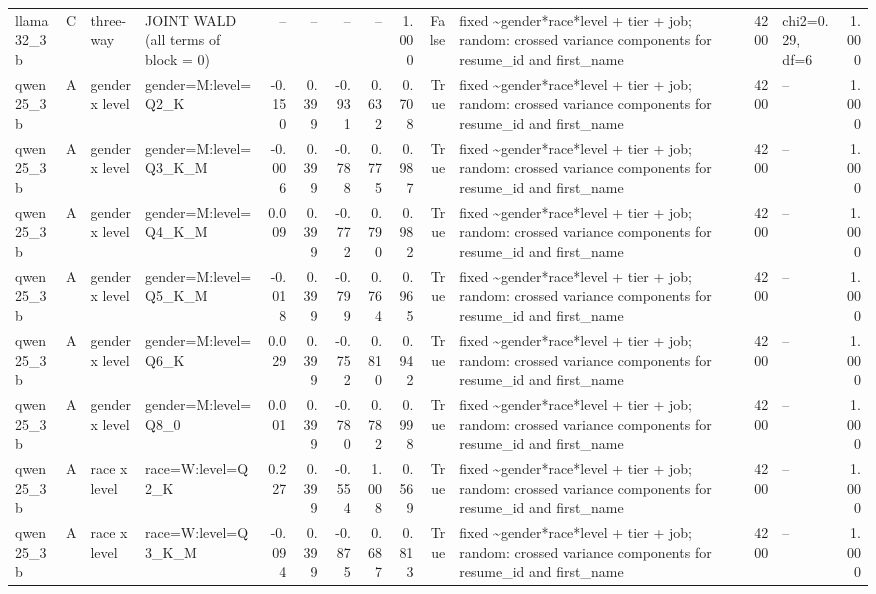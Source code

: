 \begin{tabular}{llllrrrrrrlrlr}
llama32\_3b & C & three-way & JOINT WALD (all terms of block = 0) & -- & -- & -- & -- & 1.000 & False & fixed \textasciitilde \space gender*race*level + tier + job; random: crossed variance components for resume\_id and first\_name & 4200 & chi2=0.29, df=6 & 1.000 \\
qwen25\_3b & A & gender x level & gender=M:level=Q2\_K & -0.150 & 0.399 & -0.931 & 0.632 & 0.708 & True & fixed \textasciitilde \space gender*race*level + tier + job; random: crossed variance components for resume\_id and first\_name & 4200 & -- & 1.000 \\
qwen25\_3b & A & gender x level & gender=M:level=Q3\_K\_M & -0.006 & 0.399 & -0.788 & 0.775 & 0.987 & True & fixed \textasciitilde \space gender*race*level + tier + job; random: crossed variance components for resume\_id and first\_name & 4200 & -- & 1.000 \\
qwen25\_3b & A & gender x level & gender=M:level=Q4\_K\_M & 0.009 & 0.399 & -0.772 & 0.790 & 0.982 & True & fixed \textasciitilde \space gender*race*level + tier + job; random: crossed variance components for resume\_id and first\_name & 4200 & -- & 1.000 \\
qwen25\_3b & A & gender x level & gender=M:level=Q5\_K\_M & -0.018 & 0.399 & -0.799 & 0.764 & 0.965 & True & fixed \textasciitilde \space gender*race*level + tier + job; random: crossed variance components for resume\_id and first\_name & 4200 & -- & 1.000 \\
qwen25\_3b & A & gender x level & gender=M:level=Q6\_K & 0.029 & 0.399 & -0.752 & 0.810 & 0.942 & True & fixed \textasciitilde \space gender*race*level + tier + job; random: crossed variance components for resume\_id and first\_name & 4200 & -- & 1.000 \\
qwen25\_3b & A & gender x level & gender=M:level=Q8\_0 & 0.001 & 0.399 & -0.780 & 0.782 & 0.998 & True & fixed \textasciitilde \space gender*race*level + tier + job; random: crossed variance components for resume\_id and first\_name & 4200 & -- & 1.000 \\
qwen25\_3b & A & race x level & race=W:level=Q2\_K & 0.227 & 0.399 & -0.554 & 1.008 & 0.569 & True & fixed \textasciitilde \space gender*race*level + tier + job; random: crossed variance components for resume\_id and first\_name & 4200 & -- & 1.000 \\
qwen25\_3b & A & race x level & race=W:level=Q3\_K\_M & -0.094 & 0.399 & -0.875 & 0.687 & 0.813 & True & fixed \textasciitilde \space gender*race*level + tier + job; random: crossed variance components for resume\_id and first\_name & 4200 & -- & 1.000 \\

\end{tabular}
